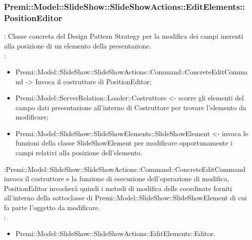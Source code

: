 {	\subsubsection{Premi::Model::SlideShow::SlideShowActions::EditElements::PositionEditor}{
				\textbf{\tipo}: Classe concreta del Design Pattern Strategy per la modifica dei campi inerenti alla posizione di un elemento della presentazione.\\	
				\textbf{\relaz}: 
				\begin{itemize}
					\item Premi::Model::SlideShow::SlideShowActions::Command::ConcreteEditCommand -> Invoca il costruttore di PositionEditor;
                    \item Premi::Model::ServerRelation::Loader::Costruttore <- scorre gli elementi del campo dati presentazione all'interno di Costruttore per trovare l'elemento da modificare; 
                    \item Premi::Model::SlideShow::SlideShowElements::SlideShowElement <- invoca le funzioni della classe SlideShowElement per modificare opportunamente i campi relativi alla posizione dell’elemento.
				\end{itemize}	\textbf{\interfacce}:Premi::Model::SlideShow::SlideShowActions::Command::ConcreteEditCommand invoca il costruttore e la funzione di esecuzione dell’operazione di modifica, PositionEditor invocherà quindi i metodi di modifica delle coordinate forniti all’interno della sottoclasse di Premi::Model::SlideShow::SlideShowElement di cui fa parte l’oggetto da modificare.\\
                \textbf{\base}: 
                    \begin{itemize}
                    \item Premi::Model::SlideShow::SlideShowActions::EditElements::Editor.
                    \end{itemize}
                    }
}
